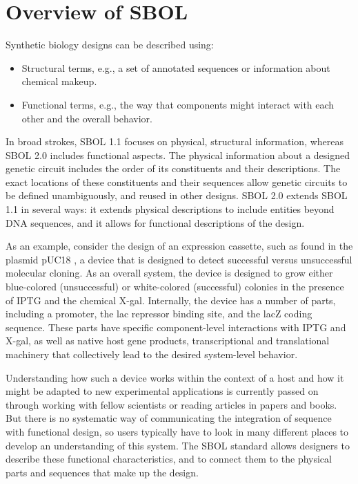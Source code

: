 \section{Overview of SBOL}

Synthetic biology designs can be described using:
\begin{itemize}
\item Structural terms, e.g., a set of annotated sequences or information about chemical makeup.
\item Functional terms, e.g., the way that components might interact with each other and the overall behavior.
\end{itemize}
In broad strokes, SBOL 1.1 focuses on physical, structural information, whereas SBOL 2.0 includes functional aspects. The physical information about a designed genetic circuit includes the order of its constituents and their descriptions. The exact locations of these constituents and their sequences allow genetic circuits to be defined unambiguously, and reused in other designs. SBOL 2.0 extends SBOL 1.1 in several ways: it extends physical descriptions to include entities beyond DNA sequences, and it allows for functional descriptions of the design. 

As an example, consider the design of an expression cassette, such as found in the plasmid pUC18 \cite{L08752.1}, a device that is designed to detect successful versus unsuccessful molecular cloning. As an overall system, the device is designed to grow either blue-colored (unsuccessful) or white-colored (successful) colonies in the presence of IPTG and the chemical X-gal. Internally, the device has a number of parts, including a promoter, the lac repressor binding site, and the lacZ coding sequence. These parts have specific component-level interactions with IPTG and X-gal, as well as native host gene products, transcriptional and translational machinery that collectively lead to the desired system-level behavior. 

Understanding how such a device works within the context of a host and how it might be adapted to new experimental applications is currently passed on through working with fellow scientists or reading articles in papers and books. But there is no systematic way of communicating the integration of sequence with functional design, so users typically have to look in many different places to develop an understanding of this system.  
The SBOL standard allows designers to describe these functional characteristics, and to connect them to the physical parts and sequences that make up the design. 


